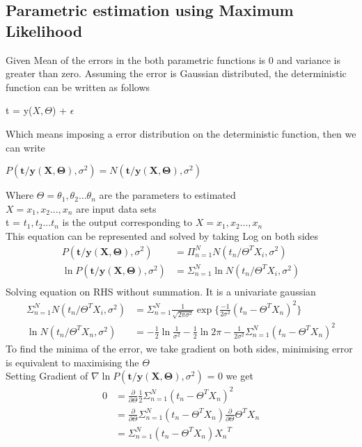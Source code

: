 \documentclass{article}
\begin{document}
\subsection{Parametric estimation using Maximum Likelihood}
Given Mean of the errors in the both parametric functions is 0 and variance is greater than zero. Assuming the error is Gaussian distributed, the deterministic function can be written as follows\\
\begin{center}
    t = y($X,\Theta$) + $\epsilon$\\
\end{center}
Which means imposing a error distribution on the deterministic function, then we can write 
\begin{center}
    $P(\mathbf{t/y(X,\Theta)},\sigma^2) = N(\mathbf{t/y(X,\Theta)},\sigma^2)$\\
\end{center}
    Where $\Theta = {\theta_1, \theta_2 ... \theta_n}$ are the parameters to estimated \\
    $X = {x_1, x_2..., x_n}$ are input data sets\\
    t = ${t_1,t_2...t_n}$ is the output corresponding to $X = {x_1, x_2..., x_n}$\\
This equation can be represented and solved by taking Log on both sides\\
\begin{align*}
    P(\mathbf{t/y(X,\Theta)},\sigma^2) &= \Pi_{n=1}^N{N(t_n/\Theta^T {X_i}, \sigma^2)}\\
    \ln{P(\mathbf{t/y(X,\Theta)},\sigma^2)} &= \Sigma_{n=1}^N \ln{{N(t_n/\Theta^T {X_i}, \sigma^2)}}\\
\end{align*}
Solving equation on RHS without summation. It is a univariate gaussian
\begin{align*}
    \Sigma_{n=1}^{N} N(t_n/\Theta^T {X_i}, \sigma^2) &= \Sigma_{n=1}^{N} \frac{1}{\sqrt{2\pi\sigma^2}} \exp \{{{\frac{-1}{2\sigma^2}(t_n-\Theta^TX_n)^2}}\}\\
     \ln{N(t_n/\Theta^T {X_n}, \sigma^2)} &= - {\frac{1}{2}\ln{\frac{1}{\sigma^2}}} - \frac{1}{2} \ln{2\pi} - \frac{1}{2\sigma^2} \Sigma_{n=1}^{N} {(t_n - \Theta^T X_n)^2}
\end{align*}
To find the minima of the error, we take gradient on both sides, minimising error is equivalent to maximising the $\Theta$\\Setting Gradient of $\nabla\ln{P(\mathbf{t/y(X,\Theta)},\sigma^2)}$ = 0 we get
\begin{align*}
    0 &= \frac{\partial}{\partial \Theta} { \frac{1}{2} \Sigma_{n=1}^{N}  {(t_n - \Theta^T X_n)^2}}\\
    &= \frac{\partial}{\partial \Theta} \Sigma_{n=1}^{N} {(t_n - \Theta^T X_n)}  \frac{\partial}{\partial \Theta} \Theta^T X_n\\
    &=\Sigma_{n=1}^{N} {(t_n - \Theta^T X_n)} {X_n}^T\\
\end{align*}
\end{document}
